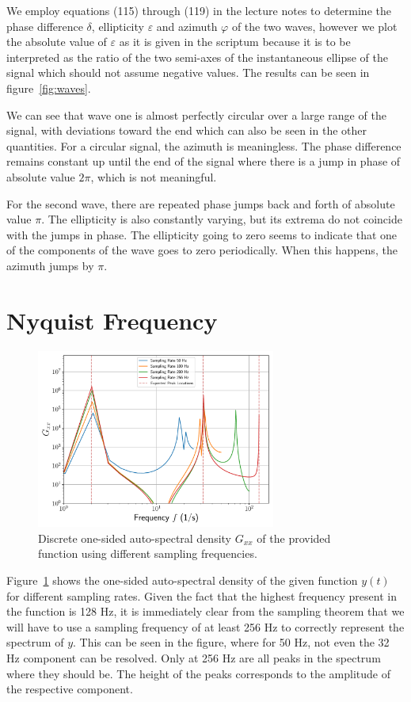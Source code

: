 \documentclass[a4paper,DIV=12,english]{scrartcl}
\begin{document}
We employ equations (115) through (119) in the lecture notes to determine the phase difference $\delta$, ellipticity $\varepsilon$ and azimuth $\varphi$ of the two waves, however we plot the absolute value of $\varepsilon$ as it is given in the scriptum because it is to be interpreted as the ratio of the two semi-axes of the instantaneous ellipse of the signal which should not assume negative values. The results can be seen in figure~\ref{fig:waves}. 

We can see that wave one is almost perfectly circular over a large range of the signal, with deviations toward the end which can also be seen in the other quantities. For a circular signal, the azimuth is meaningless. The phase difference remains constant up until the end of the signal where there is a jump in phase of absolute value $2\pi$, which is not meaningful.

For the second wave, there are repeated phase jumps back and forth of absolute value $\pi$. The ellipticity is also constantly varying, but its extrema do not coincide with the jumps in phase. The ellipticity going to zero seems to indicate that one of the components of the wave goes to zero periodically. When this happens, the azimuth jumps by $\pi$.
\FloatBarrier
\newpage
\section{Nyquist Frequency}
\begin{figure}[h]
    \centering
    \includegraphics[width=0.7\textwidth]{../G.pdf}
    \caption{Discrete one-sided auto-spectral density $G_{xx}$ of the provided function using different sampling frequencies.}
    \label{fig:g}
\end{figure}
Figure~\ref{fig:g} shows the one-sided auto-spectral density of the given function $y(t)$ for different sampling rates. Given the fact that the highest frequency present in the function is 128 Hz, it is immediately clear from the sampling theorem that we will have to use a sampling frequency of at least 256 Hz to correctly represent the spectrum of $y$. This can be seen in the figure, where for 50 Hz, not even the 32 Hz component can be resolved. Only at 256 Hz are all peaks in the spectrum where they should be. The height of the peaks corresponds to the amplitude of the respective component.
\end{document}
